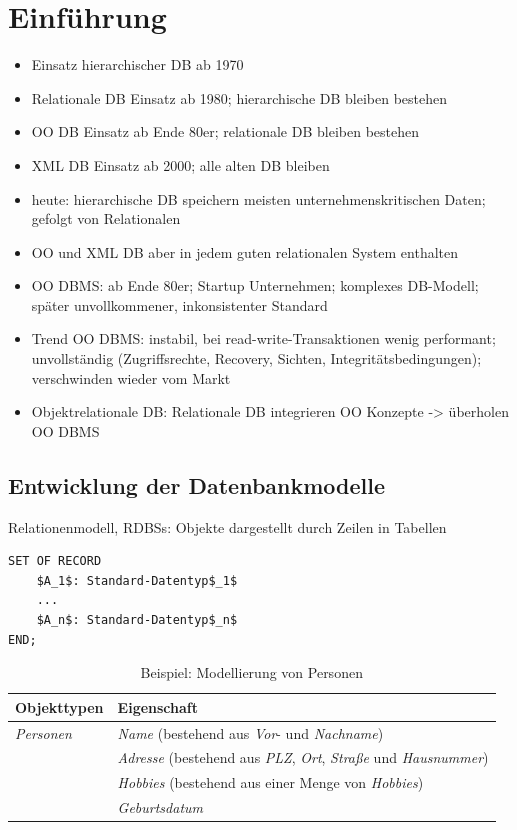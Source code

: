 \section{Einführung}
\begin{itemize}
	\item Einsatz hierarchischer DB ab 1970
	\item Relationale DB Einsatz ab 1980; hierarchische DB bleiben bestehen
	\item OO DB Einsatz ab Ende 80er; relationale DB bleiben bestehen
	\item XML DB Einsatz ab 2000; alle alten DB bleiben 
	\item heute: hierarchische DB speichern meisten unternehmenskritischen Daten; gefolgt von Relationalen
	\item OO und XML DB aber in jedem guten relationalen System enthalten
	\item OO DBMS: ab Ende 80er; Startup Unternehmen; komplexes DB-Modell; später unvollkommener, inkonsistenter Standard
	\item Trend OO DBMS: instabil, bei read-write-Transaktionen wenig performant; unvollständig (Zugriffsrechte, Recovery, Sichten, Integritätsbedingungen); verschwinden wieder vom Markt
	\item Objektrelationale DB: Relationale DB integrieren OO Konzepte -> überholen OO DBMS
\end{itemize}

\subsection{Entwicklung der Datenbankmodelle}
Relationenmodell, RDBSs: Objekte dargestellt durch Zeilen in Tabellen
\begin{lstlisting}[mathescape=true]
SET OF RECORD
	$A_1$: Standard-Datentyp$_1$
	...
	$A_n$: Standard-Datentyp$_n$
END;
\end{lstlisting}
\begin{table}[!h]
	\centering
	\begin{tabular}{|l|l|}
		\hline
		Objekttypen	& Eigenschaft\\
		\hline
		\hline
		\textit{Personen}	& \textit{Name} (bestehend aus \textit{Vor}- und \textit{Nachname})\\
							& \textit{Adresse} (bestehend aus \textit{PLZ}, \textit{Ort}, \textit{Straße} und \textit{Hausnummer})\\
							& \textit{Hobbies} (bestehend aus einer Menge von \textit{Hobbies})\\
							& \textit{Geburtsdatum}\\
		\hline
	\end{tabular}
	\caption{Beispiel: Modellierung von Personen}
\end{table}

